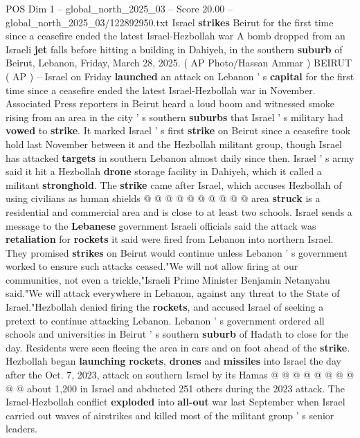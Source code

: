 \begin{textsample}{POS Dim 1 – global\_north\_2025\_03 – Score 20.00 – global\_north\_2025\_03/122892950.txt}  \label{ex:f1_pos_424}
Israel \textbf{strikes} Beirut for the first time since a ceasefire ended the latest Israel-Hezbollah war A bomb dropped from an Israeli \textbf{jet} falls before hitting a building in Dahiyeh, in the southern \textbf{suburb} of Beirut, Lebanon, Friday, March 28, 2025. ( AP Photo/Hassan Ammar ) BEIRUT ( AP ) -- Israel on Friday \textbf{launched} an attack on Lebanon ' s \textbf{capital} for the first time since a ceasefire ended the latest Israel-Hezbollah war in November.
Associated Press reporters in Beirut heard a loud boom and witnessed smoke rising from an area in the city ' s southern \textbf{suburbs} that Israel ' s military had \textbf{vowed} to \textbf{strike}.
It marked Israel ' s first \textbf{strike} on Beirut since a ceasefire took hold last November between it and the Hezbollah militant group, though Israel has attacked \textbf{targets} in southern Lebanon almost daily since then.
Israel ' s army said it hit a Hezbollah \textbf{drone} storage facility in Dahiyeh, which it called a militant \textbf{stronghold}.
The \textbf{strike} came after Israel, which accuses Hezbollah of using civilians as human shields @ @ @ @ @ @ @ @ @ @ area \textbf{struck} is a residential and commercial area and is close to at least two schools.
Israel sends a message to the \textbf{Lebanese} government Israeli officials said the attack was \textbf{retaliation} for \textbf{rockets} it said were fired from Lebanon into northern Israel.
They promised \textbf{strikes} on Beirut would continue unless Lebanon ' s government worked to ensure such attacks ceased."We will not allow firing at our communities, not even a trickle,"Israeli Prime Minister Benjamin Netanyahu said."We will attack everywhere in Lebanon, against any threat to the State of Israel."Hezbollah denied firing the \textbf{rockets}, and accused Israel of seeking a pretext to continue attacking Lebanon.
Lebanon ' s government ordered all schools and universities in Beirut ' s southern \textbf{suburb} of Hadath to close for the day.
Residents were seen fleeing the area in cars and on foot ahead of the \textbf{strike}.
Hezbollah began \textbf{launching} \textbf{rockets}, \textbf{drones} and \textbf{missiles} into Israel the day after the Oct. 7, 2023, attack on southern Israel by its Hamas @ @ @ @ @ @ @ @ @ @ about 1,200 in Israel and abducted 251 others during the 2023 attack.
The Israel-Hezbollah conflict \textbf{exploded} into \textbf{all-out} war last September when Israel carried out waves of airstrikes and killed most of the militant group ' s senior leaders.

\end{textsample}
